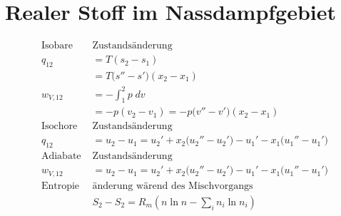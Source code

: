 \documentclass[twocolumn]{article}
\begin{document}
\bigskip
\bigskip
\bigskip
\bigskip

%                                                                         

\section{Realer Stoff im Nassdampfgebiet}
\begin{align*}
	\text{Isobare } &\text{Zustandsänderung} \\
	q_{12} &= T(s_2 - s_1) \\
	&= T\Big(s'' - s'\Big)(x_2-x_1) \\
	w_{V,12} &= - \int_{1}^{2} p\; dv \\
	&= -p(v_2-v_1) = -p\Big(v'' -v'\Big)(x_2-x_1) \\
	\text{Isochore } &\text{Zustandsänderung} \\
	q_{12} &= u_2 - u_1 = u_2' + x_2\Big(u_2'' - u_2' \Big) - u_1' - x_1\Big(u_1'' - u_1'\Big) \\
	\text{Adiabate } &\text{Zustandsänderung} \\
	w_{V,12} &= u_2 - u_1 = u_2' + x_2 \Big( u_2'' - u_2' \Big) - u_1' - x_1\Big(u_1'' - u_1'\Big) \\
	\text{Entropie} & \text{änderung wärend des Mischvorgangs} \\
	&S_2-S_2 = R_m \left ( n \ln n - \sum_{i}^{} n_i \ln n_i \right ) \\
\end{align*}

\end{document}
